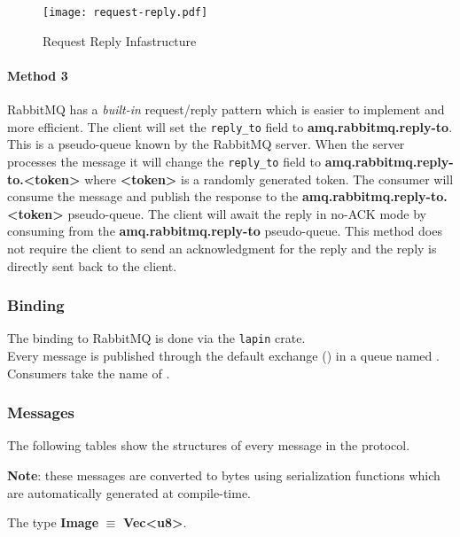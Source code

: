 \documentclass[../documentation.tex]{subfiles}
\begin{document}
\begin{figure}[h]
    \centering
    \texttt{[image: request-reply.pdf]}
    \caption{Request Reply Infastructure}
\end{figure}

\paragraph{Method 3} RabbitMQ has a \textit{built-in} request/reply pattern which is easier to implement and more efficient.
The client will set the \texttt{reply\_to} field to \textbf{amq.rabbitmq.reply-to}.
This is a pseudo-queue known by the RabbitMQ server. When the server processes the message it will change
the \texttt{reply\_to} field to \textbf{amq.rabbitmq.reply-to.<token>} where \textbf{<token>} is a randomly generated
token. The consumer will consume the message and publish the response to the \textbf{amq.rabbitmq.reply-to.<token>}
pseudo-queue. The client will await the reply in no-ACK mode by consuming from the \textbf{amq.rabbitmq.reply-to} pseudo-queue.
This method does not require the client to send an acknowledgment for the reply and the reply is directly sent back to the client.

\pagebreak

\subsubsection{Binding}

The binding to RabbitMQ is done via the \texttt{lapin} crate. \\
Every message is published through the default exchange (\quotes{})
in a queue named . Consumers take the name of .

\pagebreak

\subsubsection{Messages}

The following tables show the structures of every message
in the protocol.

\textbf{\color{red} Note}: these messages are converted to bytes
using serialization functions which are automatically generated at compile-time.

The type \textbf{Image} \(\equiv\) \textbf{Vec<u8>}.

\newcommand{\tline}{
    \\ \hline
}
\end{document}
